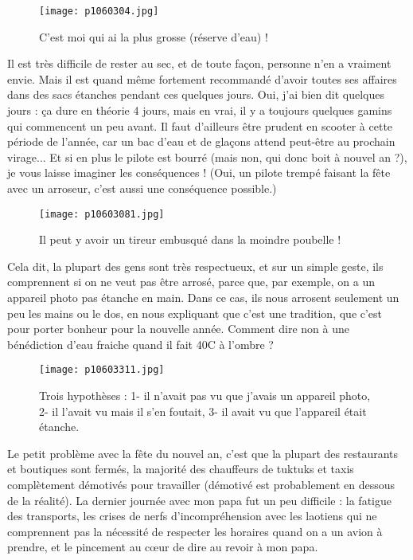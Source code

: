 \documentclass{book}
\begin{document}
\begin{figure}[h]
\centering
\texttt{[image: p1060304.jpg]}
\caption*{C'est moi qui ai la plus grosse (réserve d'eau) !}
\end{figure}

Il est très difficile de rester au sec, et de toute façon, personne n'en a vraiment envie. Mais il est quand même fortement recommandé d'avoir toutes ses affaires dans des sacs étanches pendant ces quelques jours. Oui, j'ai bien dit quelques jours : ça dure en théorie 4 jours, mais en vrai, il y a toujours quelques gamins qui commencent un peu avant. Il faut d'ailleurs être prudent en scooter à cette période de l'année, car un bac d'eau et de glaçons attend peut-être au prochain virage... Et si en plus le pilote est bourré (mais non, qui donc boit à nouvel an ?), je vous laisse imaginer les conséquences ! (Oui, un pilote trempé faisant la fête avec un arroseur, c'est aussi une conséquence possible.)


\begin{figure}[h]
\centering
\texttt{[image: p10603081.jpg]}
\caption*{Il peut y avoir un tireur embusqué dans la moindre poubelle !}
\end{figure}

Cela dit, la plupart des gens sont très respectueux, et sur un simple geste, ils comprennent si on ne veut pas être arrosé, parce que, par exemple, on a un appareil photo pas étanche en main. Dans ce cas, ils nous arrosent seulement un peu les mains ou le dos, en nous expliquant que c'est une tradition, que c'est pour porter bonheur pour la nouvelle année. Comment dire non à une bénédiction d'eau fraiche quand il fait 40\textdegree C à l'ombre ?


\begin{figure}[h]
\centering
\texttt{[image: p10603311.jpg]}
\caption*{Trois hypothèses : 1- il n'avait pas vu que j'avais un appareil photo, 2- il l'avait vu mais il s'en foutait, 3- il avait vu que l'appareil était étanche.}
\end{figure}

Le petit problème avec la fête du nouvel an, c'est que la plupart des restaurants et boutiques sont fermés, la majorité des chauffeurs de tuktuks et taxis complètement démotivés pour travailler (démotivé est probablement en dessous de la réalité). La dernier journée avec mon papa fut un peu difficile : la fatigue des transports, les crises de nerfs d'incompréhension avec les laotiens qui ne comprennent pas la nécessité de respecter les horaires quand on a un avion à prendre, et le pincement au cœur de dire au revoir à mon papa.
\end{document}

